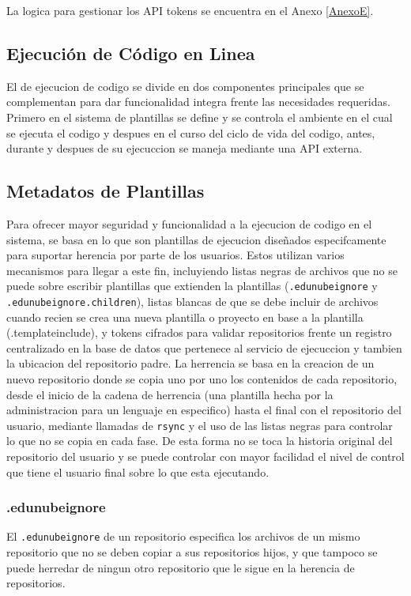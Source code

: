 La logica para gestionar los API tokens se encuentra en el Anexo \ref{AnexoE}.

\subsection{Ejecución de Código en Linea}
El de ejecucion de codigo se divide en dos componentes principales que se complementan para dar funcionalidad integra frente las necesidades requeridas. Primero en el sistema de plantillas se define y se controla el ambiente en el cual se ejecuta el codigo y despues en el curso del ciclo de vida del codigo, antes, durante y despues de su ejecuccion se maneja mediante una API externa.

\subsection{Metadatos de Plantillas}
Para ofrecer mayor seguridad y funcionalidad a la ejecucion de codigo en el sistema, se basa en lo que son plantillas de ejecucion diseñados especifcamente para suportar herencia por parte de los usuarios. Estos utilizan varios mecanismos para llegar a este fin, incluyiendo listas negras de archivos que no se puede sobre escribir plantillas que extienden la plantillas (\texttt{.edunubeignore} y\\ \texttt{.edunubeignore.children}), listas blancas de que se debe incluir de archivos cuando recien se crea una nueva plantilla o proyecto en base a la plantilla (.templateinclude), y tokens cifrados para validar repositorios frente un registro centralizado en la base de datos que pertenece al servicio de ejecuccion y tambien la ubicacion del repositorio padre. La herrencia se basa en la creacion de un nuevo repositorio donde se copia uno por uno los contenidos de cada repositorio, desde el inicio de la cadena de herrencia (una plantilla hecha por la administracion para un lenguaje en especifico) hasta el final con el repositorio del usuario, mediante llamadas de \texttt{rsync} y el uso de las listas negras para controlar lo que no se copia en cada fase. De esta forma no se toca la historia original del repositorio del usuario y se puede controlar con mayor facilidad el nivel de control que tiene el usuario final sobre lo que esta ejecutando. 
\subsubsection{.edunubeignore}
El \texttt{.edunubeignore} de un repositorio especifica los archivos de un mismo repositorio que no se deben copiar a sus repositorios hijos, y que tampoco se puede herredar de ningun otro repositorio que le sigue en la herencia de repositorios.
